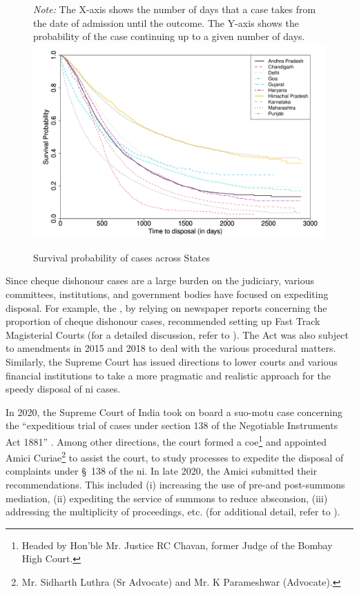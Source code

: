 \begin{figure}[!ht]
\centering
\caption{Survival probability of cases across States}\label{fig:stateSurvival}
\footnotesize
\textit{Note:} The X-axis shows the number of days that a case takes from the date of admission until the outcome. The Y-axis shows the probability of the case continuing up to a given number of days.
\includegraphics[width=\textwidth]{surv_states-1.png}
\end{figure}

Since cheque dishonour cases are a large burden on the judiciary, various committees, institutions, and government bodies have focused on expediting disposal. For example, the \cite{lci2008_138}, by relying on newspaper reports concerning the proportion of cheque dishonour cases, recommended setting up Fast Track Magisterial Courts (for a detailed discussion, refer to \cite{bhan2015_placing}). The Act was also subject to amendments in 2015 and 2018 to deal with the various procedural matters. Similarly, the Supreme Court has issued directions to lower courts and various financial institutions to take a more pragmatic and realistic approach for the speedy disposal of \gls{ni} cases.

In 2020, the Supreme Court of India took on board a suo-motu case concerning the “expeditious trial of cases under section 138 of the Negotiable Instruments Act 1881” \autocite{sc2020_138}. Among other directions, the court formed a \gls{coe}\footnote{Headed by Hon’ble Mr. Justice RC Chavan, former Judge of the Bombay High Court.} and appointed Amici Curiae\footnote{Mr. Sidharth Luthra (Sr Advocate) and Mr. K Parameshwar (Advocate).} to assist the court, to study processes to expedite the disposal of complaints under \S~138 of the \gls{ni}. In late 2020, the Amici submitted their recommendations. This included (i) increasing the use of pre-and post-summons mediation, (ii) expediting the service of summons to reduce absconsion, (iii) addressing the multiplicity of proceedings, etc. (for additional detail, refer to \cite{amicus2020_submission}).

